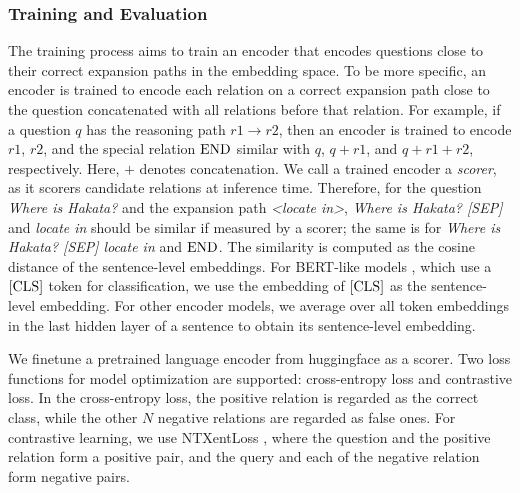 \documentclass[runningheads]{llncs}
\begin{document}
\subsubsection{Training and Evaluation}


The training process aims to train an encoder that encodes questions close to their correct expansion paths in the embedding space. To be more specific, an encoder is trained to encode each relation on a correct expansion path close to the question concatenated with all relations before that relation. For example, if a question $q$ has the reasoning path $r1 \rightarrow r2$, then an encoder is trained to encode $r1$, $r2$, and the special relation $\textnormal{END}$ similar with $q$, $q + r1$, and $q + r1 + r2$, respectively. Here, $+$ denotes concatenation. We call a trained encoder a \textit{scorer}, as it scorers candidate relations at inference time. Therefore, for the question \textit{Where is Hakata?} and the expansion path \textit{<locate in>}, \textit{Where is Hakata? [SEP]} and \textit{locate in} should be similar if measured by a scorer; the same is for \textit{Where is Hakata? [SEP] locate in} and $\textnormal{END}$. The similarity is computed as the cosine distance of the sentence-level embeddings. For BERT-like models \cite{devlin2019bert}, which use a $[\textnormal{CLS}]$ token for classification, we use the embedding of $\textnormal{[CLS]}$ as the sentence-level embedding. For other encoder models, we average over all token embeddings in the last hidden layer of a sentence to obtain its sentence-level embedding.



We finetune a pretrained language encoder from huggingface as a scorer. Two loss functions for model optimization are supported: cross-entropy loss and contrastive loss. In the cross-entropy loss, the positive relation is regarded as the correct class, while the other $N$ negative relations are regarded as false ones. For contrastive learning, we use NTXentLoss \cite{chen2020ntxentloss}, where the question and the positive relation form a positive pair, and the query and each of the negative relation form negative pairs.
\end{document}
